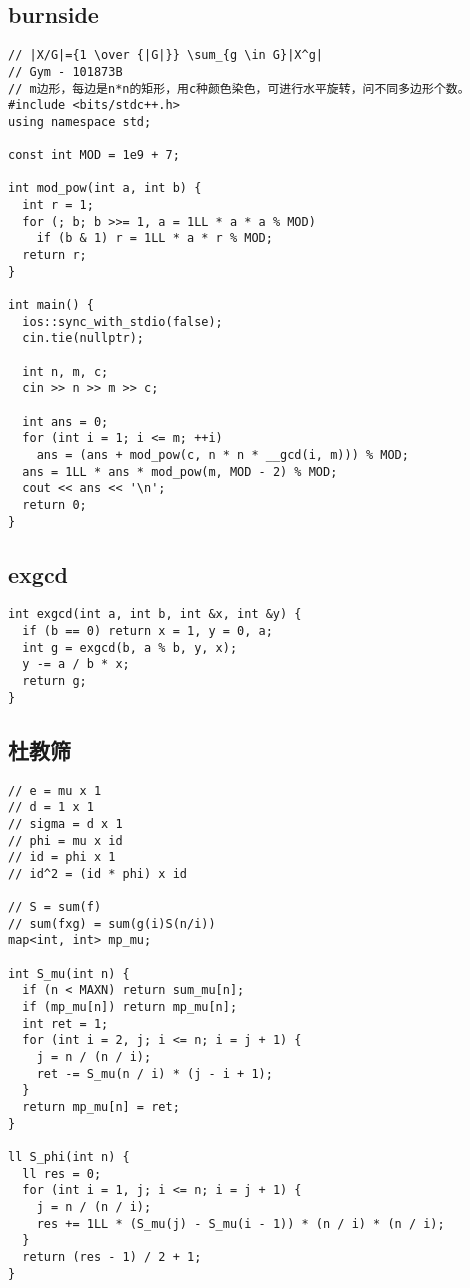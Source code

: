\documentclass[twoside]{article}
\begin{document}
\subsection{burnside}
\begin{lstlisting}
// |X/G|={1 \over {|G|}} \sum_{g \in G}|X^g|
// Gym - 101873B
// m边形，每边是n*n的矩形，用c种颜色染色，可进行水平旋转，问不同多边形个数。
#include <bits/stdc++.h>
using namespace std;

const int MOD = 1e9 + 7;

int mod_pow(int a, int b) {
  int r = 1;
  for (; b; b >>= 1, a = 1LL * a * a % MOD)
    if (b & 1) r = 1LL * a * r % MOD;
  return r;
}

int main() {
  ios::sync_with_stdio(false);
  cin.tie(nullptr);

  int n, m, c;
  cin >> n >> m >> c;

  int ans = 0;
  for (int i = 1; i <= m; ++i)
    ans = (ans + mod_pow(c, n * n * __gcd(i, m))) % MOD;
  ans = 1LL * ans * mod_pow(m, MOD - 2) % MOD;
  cout << ans << '\n';
  return 0;
}

\end{lstlisting}
\subsection{exgcd}
\begin{lstlisting}
int exgcd(int a, int b, int &x, int &y) {
  if (b == 0) return x = 1, y = 0, a;
  int g = exgcd(b, a % b, y, x);
  y -= a / b * x;
  return g;
}

\end{lstlisting}
\subsection{杜教筛}
\begin{lstlisting}
// e = mu x 1
// d = 1 x 1
// sigma = d x 1
// phi = mu x id
// id = phi x 1
// id^2 = (id * phi) x id

// S = sum(f)
// sum(fxg) = sum(g(i)S(n/i))
map<int, int> mp_mu;

int S_mu(int n) {
  if (n < MAXN) return sum_mu[n];
  if (mp_mu[n]) return mp_mu[n];
  int ret = 1;
  for (int i = 2, j; i <= n; i = j + 1) {
    j = n / (n / i);
    ret -= S_mu(n / i) * (j - i + 1);
  }
  return mp_mu[n] = ret;
}

ll S_phi(int n) {
  ll res = 0;
  for (int i = 1, j; i <= n; i = j + 1) {
    j = n / (n / i);
    res += 1LL * (S_mu(j) - S_mu(i - 1)) * (n / i) * (n / i);
  }
  return (res - 1) / 2 + 1;
}

\end{lstlisting}
\end{document}
